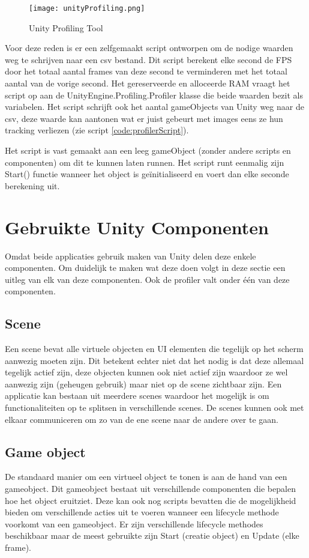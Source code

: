 \begin{figure}
    \texttt{[image: unityProfiling.png]}
    \caption{Unity Profiling Tool}
    \label{fig:unityprofiling}
\end{figure}

Voor deze reden is er een zelfgemaakt script ontworpen om de nodige waarden weg te schrijven naar een csv bestand. Dit script berekent elke second de FPS door het totaal aantal frames van deze second te verminderen met het totaal aantal van de vorige second. Het gereserveerde en alloceerde RAM vraagt het script op aan de UnityEngine.Profiling.Profiler klasse die beide waarden bezit als variabelen. Het script schrijft ook het aantal gameObjects van Unity weg naar de csv, deze waarde kan aantonen wat er juist gebeurt met images eens ze hun tracking verliezen (zie script \ref{code:profilerScript}).

Het script is vast gemaakt aan een leeg gameObject (zonder andere scripts en componenten) om dit te kunnen laten runnen. Het script runt eenmalig zijn Start() functie wanneer het object is geïnitialiseerd en voert dan elke seconde berekening uit.


\section{Gebruikte Unity Componenten}
Omdat beide applicaties gebruik maken van Unity delen deze enkele componenten. Om duidelijk te maken wat deze doen volgt in deze sectie een uitleg van elk van deze componenten. Ook de profiler valt onder één van deze componenten.

\subsection{Scene}
Een scene bevat alle virtuele objecten en  UI elementen die tegelijk op het scherm aanwezig moeten zijn. Dit betekent echter niet dat het nodig is dat deze allemaal tegelijk actief zijn, deze objecten kunnen ook niet actief zijn waardoor ze wel aanwezig zijn (geheugen gebruik) maar niet op de scene zichtbaar zijn. Een applicatie kan bestaan uit meerdere scenes waardoor het mogelijk is om functionaliteiten op te splitsen in verschillende scenes. De scenes kunnen ook met elkaar communiceren om zo van de ene scene naar de andere over te gaan.

\subsection{Game object}
De standaard manier om een virtueel object te tonen is aan de hand van een gameobject. Dit gameobject bestaat uit verschillende componenten die bepalen hoe het object eruitziet. Deze kan ook nog scripts bevatten die de mogelijkheid bieden om verschillende acties uit te voeren wanneer een lifecycle methode voorkomt van een gameobject. Er zijn verschillende lifecycle methodes beschikbaar maar de meest gebruikte zijn Start (creatie object) en Update (elke frame).

